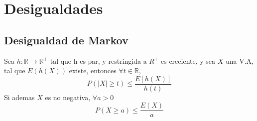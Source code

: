 \documentclass[titlepage,a4paper]{article}
\begin{document}
\section{Desigualdades}
\subsection{Desigualdad de Markov}
Sea $h: \mathbb{R} \rightarrow \mathbb{R}^{+}$ tal que h es par, y restringida a $R^{+}$ es creciente, y sea $X$ una V.A, tal que $E(h(X))$ existe,
entonces $\forall t \in \mathbb{R}$,
\begin{equation*}
    P(|X| \geq t) \leq \frac{E[h(X)]}{h(t)}
\end{equation*}
Si ademas $X$ es no negativa, $\forall a > 0$
\begin{equation*}
    P(X \geq a) \leq \frac{E(X)}{a}
\end{equation*}
\end{document}
